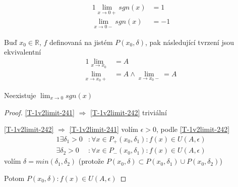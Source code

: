 \begin{example}
    \begin{alignat}{1}
        \lim_{x\to 0+}sgn(x)&=1 \\
        \lim_{x\to 0-}sgn(x)&=-1
    \end{alignat}
\end{example}

\begin{theorem}
    Buď $x_0\in\mathbb{R}$, $f$ definovaná na jistém $P(x_0,\delta)$, pak následující
        tvrzení jsou ekvivalentní
    \begin{alignat}{1}
        \lim_{x\to x_0}&=A \label{T-1v2limit-241}\\
        \lim_{x\to x_0+}&=A \land \lim_{x\to x_0-}=A \label{T-1v2limit-242}
    \end{alignat}
\end{theorem}

\begin{example}[Důsledek]
    Neexistuje $\lim_{x\to 0}sgn(x)$
\end{example}
\begin{proof}
    \ref{T-1v2limit-241} $\Rightarrow$ \ref{T-1v2limit-242} triviální
    
    \ref{T-1v2limit-242} $\Rightarrow$ \ref{T-1v2limit-241} volím $\epsilon>0$,
        podle \ref{T-1v2limit-242}
    \begin{alignat}{1}
        \exists\delta_1>0&:\forall x\in P_+(x_0,\delta_1):f(x)\in U(A,\epsilon) \\
        \exists\delta_2>0&:\forall x\in P_-(x_0,\delta_1):f(x)\in U(A,\epsilon)
    \end{alignat}
    volím $\delta=min(\delta_1, \delta_2)$ (protože
        $P(x_0,\delta)\subset P(x_0,\delta_1)\cup P(x_0,\delta_2)$)
    
    Potom $P(x_0,\delta):f(x)\in U(A,\epsilon)$
\end{proof}




